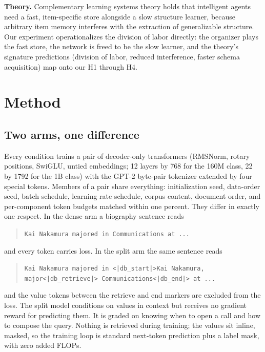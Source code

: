 \documentclass[11pt]{article}
\begin{document}
\textbf{Theory.} Complementary learning systems theory
\cite{cls,clsupdate} holds that intelligent agents need a fast,
item-specific store alongside a slow structure learner, because arbitrary
item memory interferes with the extraction of generalizable structure.
Our experiment operationalizes the division of labor directly: the
organizer plays the fast store, the network is freed to be the slow
learner, and the theory's signature predictions (division of labor,
reduced interference, faster schema acquisition) map onto our H1 through
H4.

\section{Method}

\subsection{Two arms, one difference}

Every condition trains a pair of decoder-only transformers (RMSNorm,
rotary positions, SwiGLU, untied embeddings; 12 layers by 768 for the
160M class, 22 by 1792 for the 1B class) with the GPT-2 byte-pair
tokenizer extended by four special tokens. Members of a pair share
everything: initialization seed, data-order seed, batch schedule, learning
rate schedule, corpus content, document order, and per-component token
budgets matched within one percent. They differ in exactly one respect.
In the dense arm a biography sentence reads

\begin{quote}
\texttt{Kai Nakamura majored in Communications at ...}
\end{quote}

and every token carries loss. In the split arm the same sentence reads

\begin{quote}
\texttt{Kai Nakamura majored in <|db\_start|>Kai Nakamura,
major<|db\_retrieve|> Communications<|db\_end|> at ...}
\end{quote}

and the value tokens between the retrieve and end markers are excluded
from the loss. The split model conditions on values in context but
receives no gradient reward for predicting them. It is graded on knowing
when to open a call and how to compose the query. Nothing is retrieved
during training; the values sit inline, masked, so the training loop is
standard next-token prediction plus a label mask, with zero added FLOPs.
\end{document}

